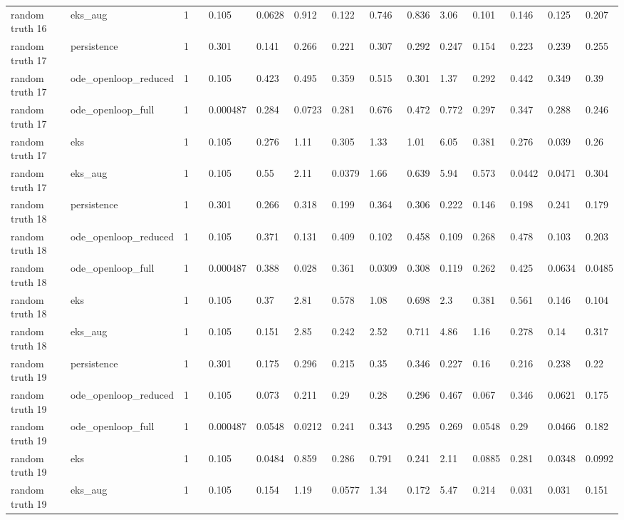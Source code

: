 \begin{table}[t]
\begin{tabular}{lllllllllllllll}
random truth 16 & eks\_aug & 1 &  & 0.105 & 0.0628 & 0.912 & 0.122 & 0.746 & 0.836 & 3.06 & 0.101 & 0.146 & 0.125 & 0.207 \\
random truth 17 & persistence & 1 &  & 0.301 & 0.141 & 0.266 & 0.221 & 0.307 & 0.292 & 0.247 & 0.154 & 0.223 & 0.239 & 0.255 \\
random truth 17 & ode\_openloop\_reduced & 1 &  & 0.105 & 0.423 & 0.495 & 0.359 & 0.515 & 0.301 & 1.37 & 0.292 & 0.442 & 0.349 & 0.39 \\
random truth 17 & ode\_openloop\_full & 1 &  & 0.000487 & 0.284 & 0.0723 & 0.281 & 0.676 & 0.472 & 0.772 & 0.297 & 0.347 & 0.288 & 0.246 \\
random truth 17 & eks & 1 &  & 0.105 & 0.276 & 1.11 & 0.305 & 1.33 & 1.01 & 6.05 & 0.381 & 0.276 & 0.039 & 0.26 \\
random truth 17 & eks\_aug & 1 &  & 0.105 & 0.55 & 2.11 & 0.0379 & 1.66 & 0.639 & 5.94 & 0.573 & 0.0442 & 0.0471 & 0.304 \\
random truth 18 & persistence & 1 &  & 0.301 & 0.266 & 0.318 & 0.199 & 0.364 & 0.306 & 0.222 & 0.146 & 0.198 & 0.241 & 0.179 \\
random truth 18 & ode\_openloop\_reduced & 1 &  & 0.105 & 0.371 & 0.131 & 0.409 & 0.102 & 0.458 & 0.109 & 0.268 & 0.478 & 0.103 & 0.203 \\
random truth 18 & ode\_openloop\_full & 1 &  & 0.000487 & 0.388 & 0.028 & 0.361 & 0.0309 & 0.308 & 0.119 & 0.262 & 0.425 & 0.0634 & 0.0485 \\
random truth 18 & eks & 1 &  & 0.105 & 0.37 & 2.81 & 0.578 & 1.08 & 0.698 & 2.3 & 0.381 & 0.561 & 0.146 & 0.104 \\
random truth 18 & eks\_aug & 1 &  & 0.105 & 0.151 & 2.85 & 0.242 & 2.52 & 0.711 & 4.86 & 1.16 & 0.278 & 0.14 & 0.317 \\
random truth 19 & persistence & 1 &  & 0.301 & 0.175 & 0.296 & 0.215 & 0.35 & 0.346 & 0.227 & 0.16 & 0.216 & 0.238 & 0.22 \\
random truth 19 & ode\_openloop\_reduced & 1 &  & 0.105 & 0.073 & 0.211 & 0.29 & 0.28 & 0.296 & 0.467 & 0.067 & 0.346 & 0.0621 & 0.175 \\
random truth 19 & ode\_openloop\_full & 1 &  & 0.000487 & 0.0548 & 0.0212 & 0.241 & 0.343 & 0.295 & 0.269 & 0.0548 & 0.29 & 0.0466 & 0.182 \\
random truth 19 & eks & 1 &  & 0.105 & 0.0484 & 0.859 & 0.286 & 0.791 & 0.241 & 2.11 & 0.0885 & 0.281 & 0.0348 & 0.0992 \\
random truth 19 & eks\_aug & 1 &  & 0.105 & 0.154 & 1.19 & 0.0577 & 1.34 & 0.172 & 5.47 & 0.214 & 0.031 & 0.031 & 0.151 \\

\end{tabular}
\end{table}
